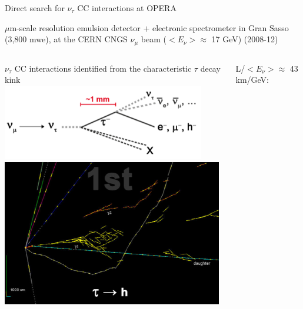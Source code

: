 %
%

\begin{frame}[t]{Direct search for $\nu_{\tau}$ CC interactions at OPERA}

{
\small
\centering
$\mu$m-scale resolution emulsion detector +
electronic spectrometer in Gran Sasso (3,800 mwe), at the CERN CNGS
$\nu_{\mu}$ beam ($<E_{\nu}> \approx$ 17 GeV) (2008-12)\\
}
\vspace{0.3cm}
\begin{columns}
  \begin{column}{0.40\textwidth}
   \centering
    {\small \color{red}
       $\nu_{\tau}$ CC interactions identified from the characteristic $\tau$ decay kink\\
    }
    \vspace{0.1cm}
    \includegraphics[width=0.90\textwidth]{./images/3nu/accelerator/opera_event_schematic.png}\\
    \includegraphics[width=0.98\textwidth]{./images/3nu/accelerator/opera_tau_1.png}
  \end{column}
  \begin{column}{0.60\textwidth}
    \centering
    \begin{itemize}
    {\small
     \item L/$<E_{\nu}> \approx$ 43 km/GeV: \\
}
\end{itemize}
\end{column}
\end{columns}
\end{frame}
